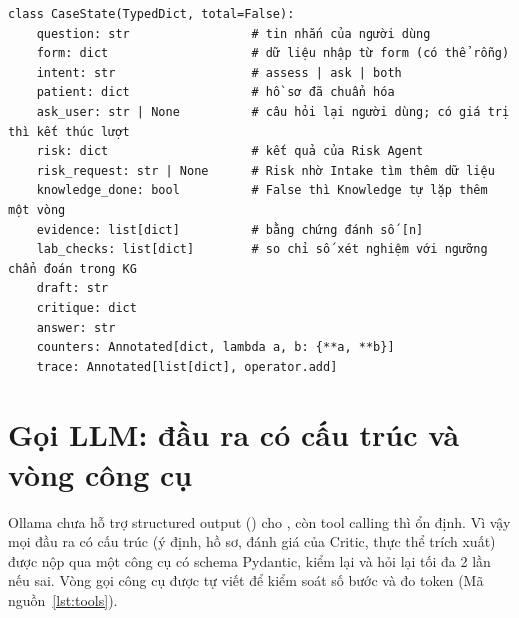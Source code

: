 \documentclass[12pt,a4paper]{report}
\newcommand{\codeinline}[1]{\texttt{\detokenize{#1}}}
\begin{document}
\begin{listing}[H]
\begin{verbatim}
class CaseState(TypedDict, total=False):
    question: str                 # tin nhắn của người dùng
    form: dict                    # dữ liệu nhập từ form (có thể rỗng)
    intent: str                   # assess | ask | both
    patient: dict                 # hồ sơ đã chuẩn hóa
    ask_user: str | None          # câu hỏi lại người dùng; có giá trị thì kết thúc lượt
    risk: dict                    # kết quả của Risk Agent
    risk_request: str | None      # Risk nhờ Intake tìm thêm dữ liệu
    knowledge_done: bool          # False thì Knowledge tự lặp thêm một vòng
    evidence: list[dict]          # bằng chứng đánh số [n]
    lab_checks: list[dict]        # so chỉ số xét nghiệm với ngưỡng chẩn đoán trong KG
    draft: str
    critique: dict
    answer: str
    counters: Annotated[dict, lambda a, b: {**a, **b}]
    trace: Annotated[list[dict], operator.add]
\end{verbatim}
\caption{Trạng thái dùng chung của các agent (\texttt{agents/state.py})}
\label{lst:state}
\end{listing}

\section{Gọi LLM: đầu ra có cấu trúc và vòng công cụ}
Ollama chưa hỗ trợ structured output (\codeinline{format=}) cho \codeinline{qwen3.5:9b}, còn tool
calling thì ổn định. Vì vậy mọi đầu ra có cấu trúc (ý định, hồ sơ, đánh giá của Critic, thực thể
trích xuất) được nộp qua một công cụ \codeinline{submit_*} có schema Pydantic, kiểm lại và hỏi lại
tối đa 2 lần nếu sai. Vòng gọi công cụ được tự viết để kiểm soát số bước và đo token
(Mã nguồn~\ref{lst:tools}).
\end{document}
